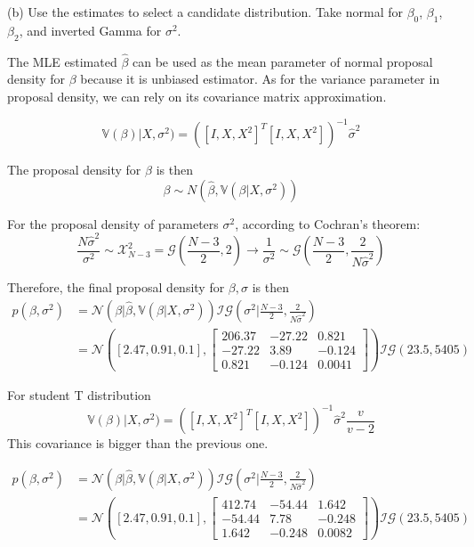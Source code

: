 \documentclass{article}
\begin{document}
(b) Use the estimates to select a candidate distribution. Take normal for $\beta_{0}$, $\beta_{1}$, $\beta_{2}$, and inverted Gamma for $\sigma^{2}$.

The MLE estimated $\hat{\beta}$ can be used as the mean parameter of normal proposal density for $\beta$ because it is unbiased estimator. As for the variance parameter in proposal density, we can rely on its covariance matrix approximation.

\begin{equation}
    \mathbb{V} (\beta) | X,\sigma^2) = ([I,X,X^2]^{T}[I,X,X^2])^{-1} \hat{\sigma}^{2} 
\end{equation}

The proposal density for $\beta$ is then
\begin{equation}
    \beta \sim N(\hat{\beta}, \mathbb{V} (\beta|X,\sigma^2))
\end{equation}

For the proposal density of parameters $\sigma^2$, according to Cochran's theorem:
\begin{equation}
    \frac{N \hat{\sigma}^2}{\sigma^2} \sim \mathcal{X}_{N-3}^2 = \mathcal{G}(\frac{N-3}{2},2) \to \frac{1}{\sigma^2} \sim  \mathcal{G}(\frac{N-3}{2},\frac{2}{N\hat{\sigma}^2})
\end{equation}

Therefore, the final proposal density for $\beta, \sigma$ is then
\begin{equation}
\begin{aligned}
    p(\beta, \sigma^2) &= \mathcal{N}(\beta| \hat{\beta}, \mathbb{V}(\beta|X,\sigma^2)) \mathcal{IG}(\sigma^2|\frac{N-3}{2},\frac{2}{N\hat{\sigma}^2}) \\
    & = \mathcal{N}([2.47,0.91,0.1],\left[ \begin{array}{ccc}
206.37 & -27.22 & 0.821 \\
-27.22 & 3.89 & -0.124 \\
0.821 & -0.124 & 0.0041
\end{array} \right]) \mathcal{IG}(23.5,5405)
\end{aligned}
\end{equation}

For student T distribution
\begin{equation}
    \mathbb{V} (\beta) | X,\sigma^2) = ([I,X,X^2]^{T}[I,X,X^2])^{-1} \hat{\sigma}^{2} \frac{v}{v-2} 
\end{equation}
This covariance is bigger than the previous one.

\begin{equation}
\begin{aligned}
    p(\beta, \sigma^2) &= \mathcal{N}(\beta| \hat{\beta}, \mathbb{V}(\beta|X,\sigma^2)) \mathcal{IG}(\sigma^2|\frac{N-3}{2},\frac{2}{N\hat{\sigma}^2}) \\
    & = \mathcal{N}([2.47,0.91,0.1],\left[ \begin{array}{ccc}
412.74 & -54.44 & 1.642 \\
-54.44 & 7.78 & -0.248 \\
1.642 & -0.248 & 0.0082
\end{array} \right]) \mathcal{IG}(23.5,5405)
\end{aligned}
\end{equation}
\end{document}
